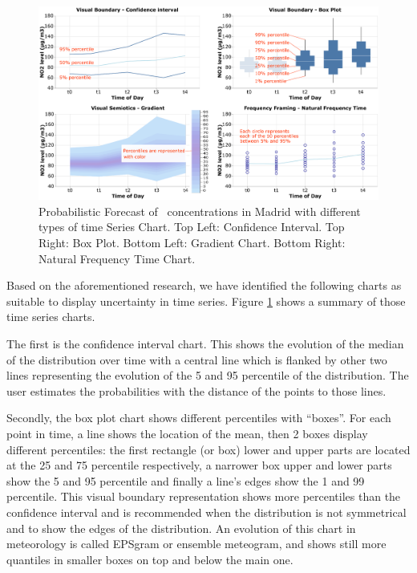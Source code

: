 \documentclass[a4paper,3p,sort&compress]{elsarticle}
\begin{document}
\begin{figure}
  \centering
  \includegraphics[width=.9\textwidth]{charts_vector}
  \caption{\label{figure:charts} Probabilistic Forecast of \no~concentrations in Madrid
    with different types of time Series Chart. Top Left: Confidence Interval.
    Top Right: Box Plot. Bottom Left: Gradient Chart. Bottom Right: Natural
    Frequency Time Chart.}
\end{figure}

Based on the aforementioned research, we have identified the following charts as
suitable to display uncertainty in time series. Figure \ref{figure:charts} shows
a summary of those time series charts.

The first is the confidence interval chart. This shows the evolution of the
median of the distribution over time with a central line which is flanked by
other two lines representing the evolution of the 5 and 95
percentile of the distribution. The user estimates the probabilities with the
distance of the points to those lines.

Secondly, the box plot chart shows different percentiles with “boxes”. For each
point in time, a line shows the location of the mean, then 2 boxes display
different percentiles: the first rectangle (or box) lower and upper parts are
located at the 25 and 75 percentile respectively, a narrower box
upper and lower parts show the 5 and 95 percentile and finally a
line’s edges show the 1 and 99 percentile. This visual boundary
representation shows more percentiles than the confidence interval and is
recommended when the distribution is not symmetrical and to show the edges of
the distribution. An evolution of this chart in meteorology is called EPSgram or
ensemble meteogram, and shows still more quantiles in smaller boxes on top and
below the main one.
\end{document}
